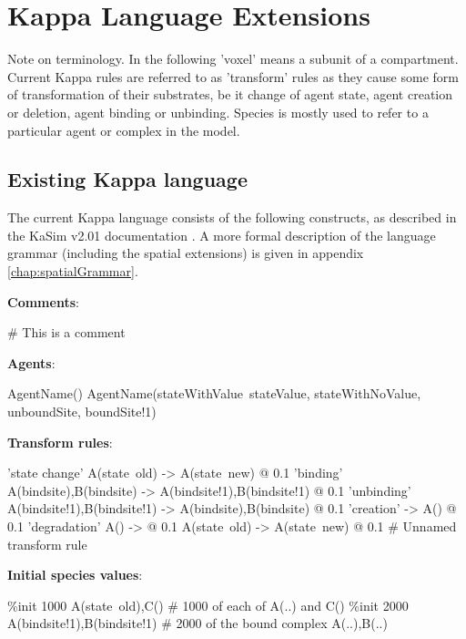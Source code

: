 \chapter{Kappa Language Extensions}

Note on terminology. In the following 'voxel' means a subunit of a compartment. Current Kappa rules are referred to as 'transform' rules as they cause some form of transformation of their substrates, be it change of agent state, agent creation or deletion, agent binding or unbinding. Species is mostly used to refer to a particular agent or complex in the model.

\section{Existing Kappa language}

The current Kappa language consists of the following constructs, as described in the KaSim v2.01 documentation \citep{krivine2012}. A more formal description of the language grammar (including the spatial extensions) is given in appendix \ref{chap:spatialGrammar}.

\textbf{Comments}:

\begin{kappasource}
# This is a comment
\end{kappasource} 

\textbf{Agents}:

\begin{kappasource}
AgentName()
AgentName(stateWithValue~stateValue, stateWithNoValue, unboundSite, boundSite!1)
\end{kappasource} 


\textbf{Transform rules}:

\begin{kappasource}
'state change' A(state~old) -> A(state~new) @ 0.1
'binding'      A(bindsite),B(bindsite) -> A(bindsite!1),B(bindsite!1) @ 0.1
'unbinding'    A(bindsite!1),B(bindsite!1) -> A(bindsite),B(bindsite) @ 0.1
'creation'     -> A() @ 0.1
'degradation'  A() -> @ 0.1
A(state~old) -> A(state~new) @ 0.1 # Unnamed transform rule
\end{kappasource} 

\textbf{Initial species values}:

\begin{kappasource}
\%init 1000 A(state~old),C()            # 1000 of each of A(..) and C()
\%init 2000 A(bindsite!1),B(bindsite!1) # 2000 of the bound complex A(..),B(..)
\end{kappasource} 

